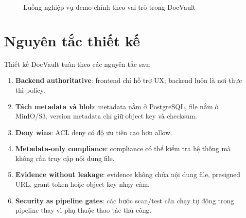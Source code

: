\begin{figure}[H]
{%
}
\caption{Luồng nghiệp vụ demo chính theo vai trò trong DocVault}
\label{fig:main-flow}
\end{figure}

\section{Nguyên tắc thiết kế}

Thiết kế DocVault tuân theo các nguyên tắc sau:

\begin{enumerate}
  \item \textbf{Backend authoritative}: frontend chỉ hỗ trợ UX; backend luôn là nơi thực thi policy.
  \item \textbf{Tách metadata và blob}: metadata nằm ở PostgreSQL, file nằm ở MinIO/S3, version metadata chỉ giữ object key và checksum.
  \item \textbf{Deny wins}: ACL deny có độ ưu tiên cao hơn allow.
  \item \textbf{Metadata-only compliance}: compliance có thể kiểm tra hệ thống mà không cần truy cập nội dung file.
  \item \textbf{Evidence without leakage}: evidence không chứa nội dung file, presigned URL, grant token hoặc object key nhạy cảm.
  \item \textbf{Security as pipeline gates}: các bước scan/test cần chạy tự động trong pipeline thay vì phụ thuộc thao tác thủ công.
\end{enumerate}
